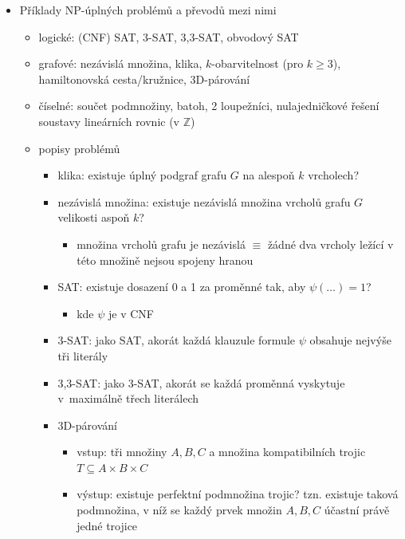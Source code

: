 \begin{itemize}
\begin{itemize}
\begin{itemize}
\item $L$ je NP-těžký $\equiv\forall K\in\text{NP}:K\to L$
\item $L$ je NP-úplný $\equiv L$ je NP-těžký $\land\;L\in\text{NP}$
\end{itemize}
\item věta: pokud $A\to B$ a $B\in \text P$, pak $A\in \text P$
\item věta: pokud $A\to B$, $B\in \text{NP}$ a $A$ je NP-úplný, pak $B$ je NP-úplný
\end{itemize}
\item Příklady NP-úplných problémů a převodů mezi nimi
\begin{itemize}
\item logické: (CNF) SAT, 3-SAT, 3,3-SAT, obvodový SAT
\item grafové: nezávislá množina, klika, $k$-obarvitelnost (pro $k\geq 3$), hamiltonovská cesta/kružnice, 3D-párování
\item číselné: součet podmnožiny, batoh, 2 loupežníci, nulajedničkové řešení soustavy lineárních rovnic (v $\mathbb Z$)
\item popisy problémů
\begin{itemize}
\item klika: existuje úplný podgraf grafu $G$ na alespoň $k$ vrcholech?
\item nezávislá množina: existuje nezávislá množina vrcholů grafu $G$ velikosti aspoň $k$?
\begin{itemize}
\item množina vrcholů grafu je nezávislá $\equiv$ žádné dva vrcholy ležící v této množině nejsou spojeny hranou
\end{itemize}
\item SAT: existuje dosazení 0 a 1 za proměnné tak, aby $\psi(\dots)=1$?
\begin{itemize}
\item kde $\psi$ je v CNF
\end{itemize}
\item 3-SAT: jako SAT, akorát každá klauzule formule $\psi$ obsahuje nejvýše tři literály
\item 3,3-SAT: jako 3-SAT, akorát se každá proměnná vyskytuje v~maximálně třech literálech
\item 3D-párování
\begin{itemize}
\item vstup: tři množiny $A,B,C$ a množina kompatibilních trojic $T\subseteq A\times B\times C$
\item výstup: existuje perfektní podmnožina trojic? tzn. existuje taková podmnožina, v níž se každý prvek množin $A,B,C$ účastní právě jedné trojice

\end{itemize}
\end{itemize}
\end{itemize}
\end{itemize}
